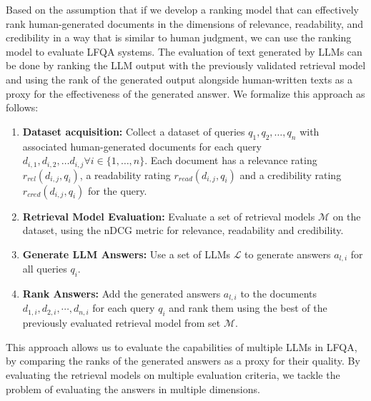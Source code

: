 Based on the assumption that if we develop a ranking model that can effectively rank human-generated documents in the dimensions of relevance, readability, and credibility in a way that is similar to human judgment, we can use the ranking model to evaluate LFQA systems.
The evaluation of text generated by LLMs can be done by ranking the LLM output with the previously validated retrieval model and using the rank of the generated output alongside human-written texts as a proxy for the effectiveness of the generated answer.
We formalize this approach as follows:
\begin{enumerate}
    \item \textbf{Dataset acquisition:} Collect a dataset of queries \( q_1, q_2, \ldots, q_n \) with associated human-generated documents for each query \( d_{i,1}, d_{i,2}, \ldots d_{i,j} \forall i \in \{1, \ldots, n\} \). Each document has a relevance rating \( r_{rel}(d_{i,j}, q_i) \), a readability rating \( r_{read}(d_{i,j}, q_i) \) and a credibility rating \( r_{cred}(d_{i,j}, q_i) \) for the query.
    \item \textbf{Retrieval Model Evaluation:} Evaluate a set of retrieval models \( \mathcal{M}\) on the dataset, using the nDCG metric for relevance, readability and credibility.
    \item \textbf{Generate LLM Answers:} Use a set of LLMs \( \mathcal{L} \) to generate answers \( a_{l,i} \) for all queries \( q_i \).
    \item \textbf{Rank Answers:} Add the generated answers \( a_{l,i} \) to the documents \(d_{1,i}, d_{2,i}, \cdots, d_{n,i} \) for each query \( q_i \) and rank them using the best of the previously evaluated retrieval model from set \( \mathcal{M} \).
\end{enumerate}
This approach allows us to evaluate the capabilities of multiple LLMs in LFQA, by comparing the ranks of the generated answers as a proxy for their quality.
By evaluating the retrieval models on multiple evaluation criteria, we tackle the problem of evaluating the answers in multiple dimensions.